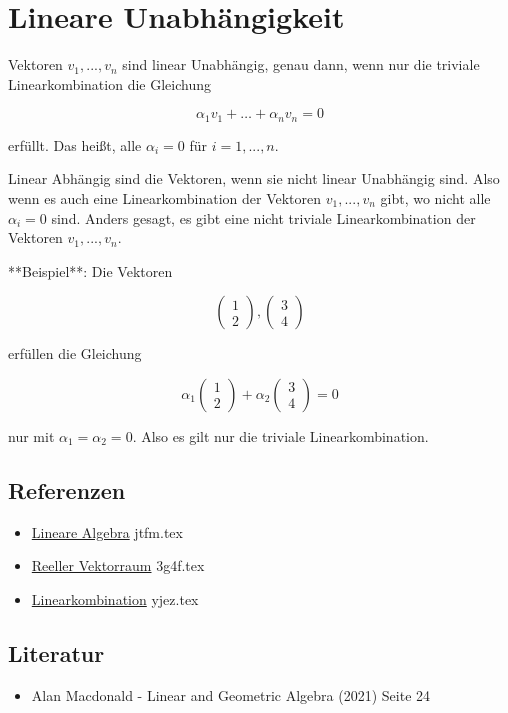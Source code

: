 \documentclass{sajzk}
\begin{document}
\section{Lineare Unabhängigkeit}
\label{v332}
Vektoren $v_1, ..., v_n$ sind linear Unabhängig, genau dann, wenn nur die
triviale Linearkombination die Gleichung

\[
\alpha_1 v_1 + \dots + \alpha_n v_n = 0
\]

erfüllt. Das heißt, alle $\alpha_i = 0$ für $i = 1, ..., n$.

Linear Abhängig sind die Vektoren, wenn sie nicht linear Unabhängig sind. Also
wenn es auch eine Linearkombination der Vektoren $v_1, ..., v_n$ gibt, wo nicht
alle $\alpha_i = 0$ sind. Anders gesagt, es gibt eine nicht triviale
Linearkombination der Vektoren $v_1, ..., v_n$.

**Beispiel**: Die Vektoren

\[
\begin{pmatrix}
 1 \\
 2
\end{pmatrix} ,
\begin{pmatrix}
 3 \\
 4
\end{pmatrix}
\]

erfüllen die Gleichung

\[
\alpha_1
\begin{pmatrix}
 1 \\
 2
\end{pmatrix}
+
\alpha_2
\begin{pmatrix}
 3 \\
 4
\end{pmatrix} = 0
\]

nur mit $\alpha_1 = \alpha_2 = 0$. Also es gilt nur die triviale Linearkombination.

\subsection{Referenzen}
\begin{itemize}
    \item \href{jtfm.pdf}{Lineare Algebra} jtfm.tex
    \item \href{3g4f.pdf}{Reeller Vektorraum} 3g4f.tex
    \item \href{yjez.pdf}{Linearkombination} yjez.tex
\end{itemize}

\subsection{Literatur}
\begin{itemize}
    \item Alan Macdonald - Linear and Geometric Algebra (2021) Seite 24
\end{itemize}
\end{document}
